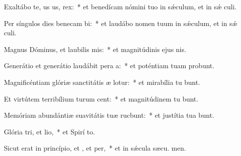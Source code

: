 \item Exaltábo te, us us, rex:~* et benedícam nómini tuo in sǽculum, et in sǽ culi.
\item Per síngulos dies benecam bi:~* et laudábo nomen tuum in sǽculum, et in sǽ culi.
\item Magnus Dóminus, et laubilis mis:~* et magnitúdinis ejus   nis.
\item Generátio et generátio laudábit pera a:~* et poténtiam tuam probunt.
\item Magnificéntiam glóriæ sanctitátis æ lotur:~* et mirabília tu bunt.
\item Et virtútem terribílium turum cent:~* et magnitúdinem tu bunt.
\item Memóriam abundántiæ suavitátis tuæ rucbunt:~* et justítia tua bunt.
\item Glória tri, et lio,~* et Spirí to.
\item Sicut erat in princípio, et , et per,~* et in sǽcula sæcu. men.
